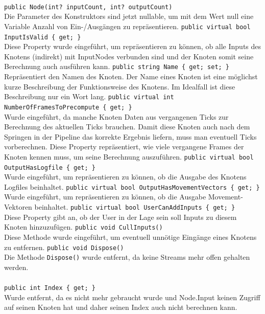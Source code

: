 \paragraph{}
\begin{itemize}
	\change \verb!public Node(int? inputCount, int? outputCount)! \\
	Die Parameter des Konstruktors sind jetzt nullable, um mit dem Wert null eine Variable Anzahl von Ein-/Ausgängen zu repräsentieren.
	\add \verb!public virtual bool InputIsValid { get; }! \\
	Diese Property wurde eingeführt, um repräsentieren zu können, ob alle Inputs des Knotens (indirekt) mit InputNodes verbunden sind und der Knoten somit seine Berechnung auch ausführen kann.
	\add \verb!public string Name { get; set; }! \\
	Repräsentiert den Namen des Knoten. Der Name eines Knoten ist eine möglichst kurze Beschreibung der Funktionsweise des Knotens. Im Idealfall ist diese Beschreibung nur ein Wort lang.
	\add \verb!public virtual int NumberOfFramesToPrecompute { get; }! \\
	Wurde eingeführt, da manche Knoten Daten aus vergangenen Ticks zur Berechnung des aktuellen Ticks brauchen. Damit diese Knoten auch nach dem Springen in der Pipeline das korrekte Ergebnis liefern, muss man eventuell Ticks vorberechnen. Diese Property repräsentiert, wie viele vergangene Frames der Knoten kennen muss, um seine Berechnung auszuführen.
	\add \verb!public virtual bool OutputHasLogfile { get; }! \\
	Wurde eingeführt, um repräsentieren zu können, ob die Ausgabe des Knotens Logfiles beinhaltet.
	\add \verb!public virtual bool OutputHasMovementVectors { get; }! \\
	Wurde eingeführt, um repräsentieren zu können, ob die Ausgabe Movement-Vektoren beinhaltet.
	\add \verb!public virtual bool UserCanAddInputs { get; }! \\
	Diese Property gibt an, ob der User in der Lage sein soll Inputs zu diesem Knoten hinzuzufügen.
	\add \verb!public void CullInputs()! \\
	Diese Methode wurde eingeführt, um eventuell unnötige Eingänge eines Knotens zu entfernen.
	\remove \verb!public void Dispose()! \\
	Die Methode \verb!Dispose()! wurde entfernt, da keine Streams mehr offen gehalten werden.
\end{itemize}

\paragraph{}
\begin{itemize}
	\remove \verb!public int Index { get; }! \\
	Wurde entfernt, da es nicht mehr gebraucht wurde und Node.Input keinen Zugriff auf seinen Knoten hat und daher seinen Index auch nicht berechnen kann.	
\end{itemize}

